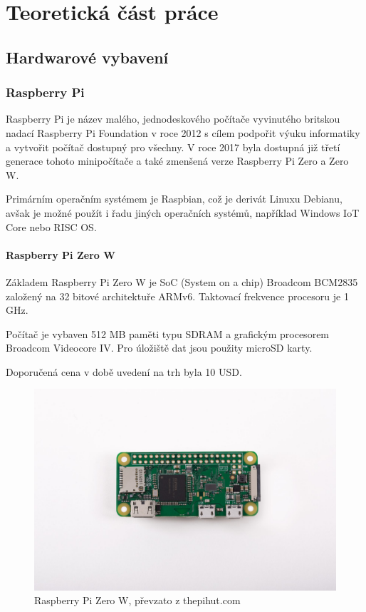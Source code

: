 \chapter[Teoretická část práce]{Teoretická část práce}

\section{Hardwarové vybavení}

\subsection*{Raspberry Pi}
Raspberry Pi je název malého, jednodeskového počítače vyvinutého britskou nadací Raspberry Pi Foundation v roce 2012 s cílem podpořit výuku informatiky a vytvořit počítač dostupný pro všechny. V roce 2017 byla dostupná již třetí generace tohoto minipočítače a také zmenšená verze Raspberry Pi Zero a Zero W.

Primárním operačním systémem je Raspbian, což je derivát Linuxu Debianu, avšak je možné použít i řadu jiných operačních systémů, například Windows IoT Core nebo RISC OS.\cite{rpidoc}

\subsubsection{Raspberry Pi Zero W}
Základem Raspberry Pi Zero W je SoC (System on a chip) Broadcom BCM2835 založený na 32 bitové architektuře ARMv6. Taktovací frekvence procesoru je 1 GHz.

Počítač je vybaven 512 MB paměti typu SDRAM a grafickým procesorem Broadcom Videocore IV. Pro úložiště dat jsou použity microSD karty.

Doporučená cena v době uvedení na trh byla 10 USD.\cite{rpidoc}

\begin{figure}[h]
  \begin{center}
    \includegraphics[scale=0.3]{obrazky/rpizero.jpg}
  \end{center}
  \caption{Raspberry Pi Zero W, převzato z thepihut.com}
\end{figure}

